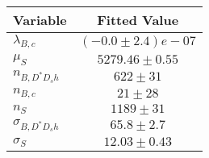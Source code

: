 \begin{tabular}[t]{lc}
\hline
Variable &Fitted Value\\
\hline\hline
$\lambda_{B,c}$&$(-0.0\pm2.4)e-07$\\
\hline
$\mu_S$&$5279.46\pm0.55$\\
\hline
$n_{B, D^* D_s h}$&$622\pm31$\\
\hline
$n_{B,c}$&$21\pm28$\\
\hline
$n_S$&$1189\pm31$\\
\hline
$\sigma_{B, D^* D_s h}$&$65.8\pm2.7$\\
\hline
$\sigma_S$&$12.03\pm0.43$\\
\hline
\end{tabular}